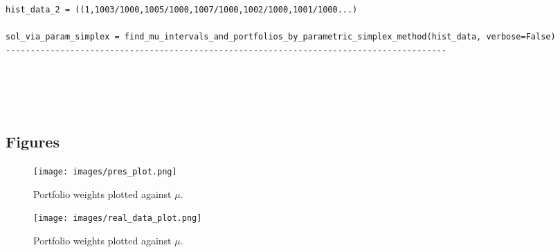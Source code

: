 \documentclass{article}
\begin{document}
\begin{changemargin}{-3cm}{-3cm}
\begin{verbatim}
hist_data_2 = ((1,1003/1000,1005/1000,1007/1000,1002/1000,1001/1000...)

sol_via_param_simplex = find_mu_intervals_and_portfolios_by_parametric_simplex_method(hist_data, verbose=False)
-----------------------------------------------------------------------------------------



    
\end{verbatim}
\end{changemargin}
\pagebreak

\subsection{Figures}
\bigskip

\begin{figure}[h!]
  \texttt{[image: images/pres\_plot.png]}
  \caption{Portfolio weights plotted against $\mu$.}
  \label{fig:birds}
\end{figure}
\pagebreak
\begin{figure}[h!]
  \texttt{[image: images/real\_data\_plot.png]}
  \caption{Portfolio weights plotted against $\mu$.}
  \label{fig:birds2}
\end{figure}

\pagebreak
\end{document}
